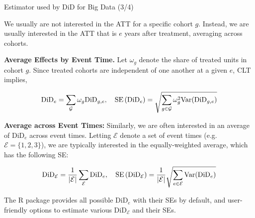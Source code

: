 \documentclass[usenames,dvipsnames]{beamer}
\begin{document}
\begin{frame}{Estimator used by DiD for Big Data (3/4)}

\vspace{-0.1cm}

We usually are not interested in the ATT for a specific cohort $g$. Instead, we are usually interested in the ATT that is $e$ years after treatment, averaging across cohorts.

\textbf{Average Effects by Event Time.} Let  $\omega_g$ denote the share of treated units in cohort $g$. Since treated  cohorts are independent of one another at a given $e$, CLT implies,

\vspace{-0.5cm}

\begin{equation} \notag
\text{DiD}_e =   \sum_\mathcal{G} \omega_g \text{DiD}_{g,e},  
\quad
\text{SE}\left( \text{DiD}_e \right) =  
\sqrt{
\sum_{g \in \mathcal{G}} \omega_g^2 \text{Var}(\text{DiD}_{g,e})
}
\end{equation} 

\vspace{-0.25cm}

\textbf{Average across Event Times:} Similarly, we are often interested in an average of  $\text{DiD}_e$ across event times. Letting $\mathcal{E}$ denote a set of event times (e.g. $\mathcal{E} = \{ 1, 2, 3\}$), we are typically interested in the equally-weighted average, which has the following SE:

\vspace{-0.7cm}

\begin{equation} \notag
\text{DiD}_{\mathcal{E}} =  \frac{1}{|\mathcal{E}|} \sum_\mathcal{E} \text{DiD}_e,
\quad
\text{SE}\left( \text{DiD}_\mathcal{E} \right) =  
 \frac{1}{|\mathcal{E}|}
\sqrt{
\sum_{e \in \mathcal{E}} \text{Var}(\text{DiD}_{e})
}
\end{equation} 

\vspace{-0.1cm}

The R package provides all possible  $ \text{DiD}_e$ with their SEs by default, and user-friendly options to estimate various $\text{DiD}_\mathcal{E}$ and their SEs.

\end{frame}
\end{document}
